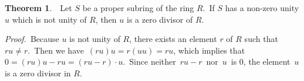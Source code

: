 \documentclass[12pt]{article}
\theoremstyle{definition}
\newtheorem*{thmplain}{Theorem}
\begin{document}
\begin{thmplain}
\, \,Let $S$ be a proper subring of the ring $R$. \,If $S$ has a non-zero unity $u$ which is not unity of $R$, then $u$ is a zero divisor of $R$.
\end{thmplain}

{\em Proof.} \,Because $u$ is not unity of $R$, there exists an element $r$ of $R$ such that \,$ru \neq r$. \,Then we have \,$(ru)u = r(uu) = ru$, which implies that \,$0 = (ru)u-ru = (ru-r)\cdot u$. \,Since neither \,$ru-r$\, nor \,$u$\, is 0, the element \,$u$\, is a zero divisor in $R$.
\end{document}
